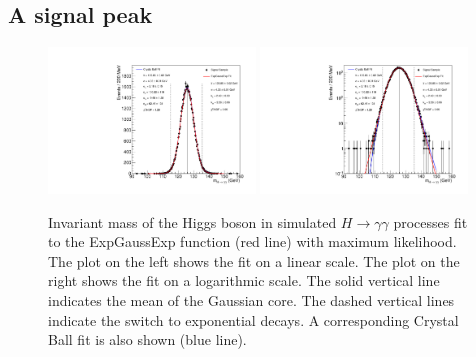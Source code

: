 \documentclass[10pt,letterpaper]{article}
\begin{document}


\subsection{A signal peak}

\begin{figure}[H]
\centering
\includegraphics[width=0.49\textwidth]{c.pdf}
\includegraphics[width=0.49\textwidth]{c_log.pdf}
\caption{Invariant mass of the Higgs boson in simulated $H\to\gamma\gamma$ processes fit to the ExpGaussExp function (red line) with maximum likelihood. The plot on the left shows the fit on a linear scale. The plot on the right shows the fit on a logarithmic scale. The solid vertical line indicates the mean of the Gaussian core. The dashed vertical lines indicate the switch to exponential decays. A corresponding Crystal Ball fit is also shown (blue line).}
\label{fig:HGGFit}
\end{figure}
\end{document}
